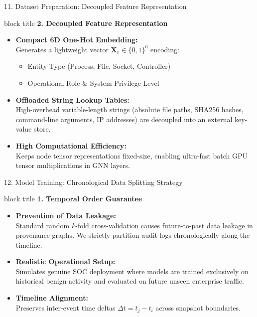 \documentclass[aspectratio=169,10pt]{beamer}
\begin{document}
\begin{frame}{11. Dataset Preparation: Decoupled Feature Representation}
\vspace{0.3em}
\begin{beamercolorbox}[rounded=true,shadow=false,sep=0.45em,wd=\textwidth]{block title}
\textbf{\scriptsize 2. Decoupled Feature Representation}
\end{beamercolorbox}
\vspace{0.3em}
{\fontsize{8.0pt}{11.5pt}\selectfont
\begin{itemize}\itemsep0.45em
  \item \textbf{Compact 6D One-Hot Embedding:}\\
  Generates a lightweight vector $\mathbf{X}_v \in \{0,1\}^6$ encoding:
  \begin{itemize}\itemsep0.25em
    \item Entity Type (Process, File, Socket, Controller)
    \item Operational Role \& System Privilege Level
  \end{itemize}
  \item \textbf{Offloaded String Lookup Tables:}\\
  High-overhead variable-length strings (absolute file paths, SHA256 hashes, command-line arguments, IP addresses) are decoupled into an external key-value store.
  \item \textbf{High Computational Efficiency:}\\
  Keeps node tensor representations fixed-size, enabling ultra-fast batch GPU tensor multiplications in GNN layers.
\end{itemize}
}
\end{frame}

\begin{frame}{12. Model Training: Chronological Data Splitting Strategy}
\vspace{0.3em}
\begin{beamercolorbox}[rounded=true,shadow=false,sep=0.45em,wd=\textwidth]{block title}
\textbf{\scriptsize 1. Temporal Order Guarantee}
\end{beamercolorbox}
\vspace{0.3em}
{\fontsize{8.0pt}{11.8pt}\selectfont
\begin{itemize}\itemsep0.60em
  \item \textbf{Prevention of Data Leakage:}\\
  Standard random $k$-fold cross-validation causes future-to-past data leakage in provenance graphs. We strictly partition audit logs chronologically along the timeline.
  \item \textbf{Realistic Operational Setup:}\\
  Simulates genuine SOC deployment where models are trained exclusively on historical benign activity and evaluated on future unseen enterprise traffic.
  \item \textbf{Timeline Alignment:}\\
  Preserves inter-event time deltas $\Delta t = t_j - t_i$ across snapshot boundaries.
\end{itemize}
}
\end{frame}
\end{document}
